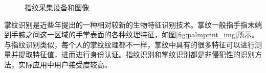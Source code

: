 \begin{figure}[ht]
\centering  %
\caption{指纹采集设备和图像\cite{maltoni2009handbook}}
\label{fig:fingerprint}
\end{figure}

掌纹识别是近些年提出的一种相对较新的生物特征识别技术。掌纹一般指手指末端到手腕之间这一区域的手掌表面的各种纹理特征，如图\ref{fig:palmprint_img}所示。与指纹识别类似，每个人的掌纹纹理都不一样，掌纹中具有的很多特征可以进行测量并提取特征值，进而进行身份认证。指纹识别和掌纹识别都是非侵犯性的识别方法，实际应用中用户接受度较高。

